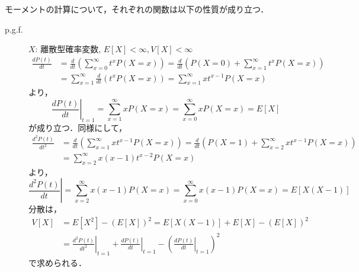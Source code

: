 \documentclass{jsreport}
\begin{document}
モーメントの計算について，それぞれの関数は以下の性質が成り立つ．
\begin{description}
  \item[p.g.f.]
  $X$: 離散型確率変数, $E[X] < \infty, V[X] < \infty$
  \begin{align}
    \frac{dP(t)}{dt} &= \frac{d}{dt} \left(\sum_{x = 0}^{\infty} t^x P(X = x) \right) = \frac{d}{dt} \left(P(X = 0) + \sum_{x=1}^{\infty} t^x P(X = x)\right) \nonumber \\
    &= \sum_{x=1}^{\infty} \frac{d}{dt} (t^x P(X = x)) = \sum_{x = 1}^{\infty} x t^{x - 1} P(X = x) \nonumber
  \end{align}
  より，
  \begin{equation}
    \left.\frac{dP(t)}{dt}\right|_{t = 1} = \sum_{x = 1}^{\infty} xP(X = x) = \sum_{x = 0}^{\infty} xP(X = x) = E[X] \nonumber
  \end{equation}
  が成り立つ．同様にして，
  \begin{align}
    \frac{d^2P(t)}{dt^2} &= \frac{d}{dt} \left(\sum_{x = 1}^{\infty} x t^{x - 1} P(X = x)\right) = \frac{d}{dt} \left(P(X = 1) + \sum_{x = 2}^{\infty} xt^{x - 1} P(X = x)\right) \nonumber \\
    &= \sum_{x = 2}^{\infty} x(x - 1)t^{x - 2} P(X = x) \nonumber
  \end{align}
  より，
  \begin{equation}
    \left.\frac{d^2P(t)}{dt}\right| = \sum_{x = 2}^{\infty} x(x - 1)P(X = x) = \sum_{x = 0}^{\infty} x(x - 1)P(X = x) = E[X(X - 1)] \nonumber
  \end{equation}
  分散は，
  \begin{align}
    V[X] &= E[X^2] - (E[X])^2 = E[X(X - 1)] + E[X] - (E[X])^2 \nonumber \\
    &= \left.\frac{d^2 P(t)}{dt^2}\right|_{t = 1} + \left.\frac{d P(t)}{dt}\right|_{t = 1} - \left(\left.\frac{d P(t)}{dt}\right|_{t = 1}\right)^2 \nonumber
  \end{align}
  で求められる．


\end{description}
\end{document}

